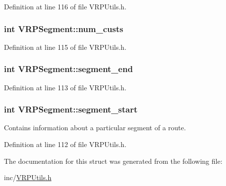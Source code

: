 Definition at line 116 of file VRPUtils.h.

\hypertarget{struct_v_r_p_segment_a99f4fbbcd109957cea9fa07fe1329f1f}{
\subsubsection[{num\_\-custs}]{\setlength{\rightskip}{0pt plus 5cm}int {\bf VRPSegment::num\_\-custs}}}
\label{struct_v_r_p_segment_a99f4fbbcd109957cea9fa07fe1329f1f}


Definition at line 115 of file VRPUtils.h.

\hypertarget{struct_v_r_p_segment_a8820dcf204c2c3b146f74066ae127671}{
\subsubsection[{segment\_\-end}]{\setlength{\rightskip}{0pt plus 5cm}int {\bf VRPSegment::segment\_\-end}}}
\label{struct_v_r_p_segment_a8820dcf204c2c3b146f74066ae127671}


Definition at line 113 of file VRPUtils.h.

\hypertarget{struct_v_r_p_segment_ab545be974d0668c20662853470895ad5}{
\subsubsection[{segment\_\-start}]{\setlength{\rightskip}{0pt plus 5cm}int {\bf VRPSegment::segment\_\-start}}}
\label{struct_v_r_p_segment_ab545be974d0668c20662853470895ad5}
Contains information about a particular segment of a route. 

Definition at line 112 of file VRPUtils.h.



The documentation for this struct was generated from the following file:\begin{DoxyCompactItemize}
\item 
inc/\hyperlink{_v_r_p_utils_8h}{VRPUtils.h}\end{DoxyCompactItemize}
